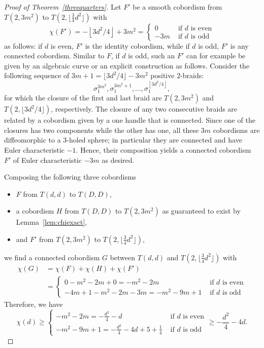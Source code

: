 \begin{proof}[Proof of Theorem~\ref{threequarters}]
Let $F'$ be a smooth cobordism from $T(2,3m^2)$ to $T(2,\lfloor \frac{3}{4}d^2\rfloor)$ with
\[
\chi(F')=-\left\lfloor 3d^2/4\right\rfloor+3m^2=
\begin{cases}
0&\text{ if $d$ is even}\\
-3m&\text{ if $d$ is odd}
\end{cases}
\]
as follows: if $d$ is even, $F'$ is the identity cobordism, while if $d$ is odd, $F'$ is any connected cobordism. Similar to $F$, if $d$ is odd, such an $F'$ can for example be given by an algebraic curve or an explicit construction as follows. Consider the following sequence of $3m+1=\lfloor 3d^2/4\rfloor-3m^2$ positive $2$-braids:
\[
\sigma_1^{3m^2},
\sigma_1^{3m^2+1},
\dots,
\sigma_1^{\left\lfloor 3d^2/4\right\rfloor},
\]
for which the closure of the first and last braid are $T(2,3m^2)$ and $T(2,\lfloor 3d^2/4\rfloor)$, respectively. The closure of any two consecutive braids are related by a cobordism given by a one handle that is connected. Since one of the closures has two components while the other has one, all these $3m$ cobordisms are diffeomorphic to a $3$-holed sphere; in particular they are connected and have Euler characteristic $-1$. Hence, their composition yields a connected cobordism $F'$ of Euler characteristic $-3m$ as desired.

Composing the following three cobordisms
\begin{itemize}
\item $F$ from $T(d,d)$ to $T(D,D)$,
\item a cobordism $H$ from $T(D,D)$ to $T(2,3m^2)$ as guaranteed to exist by Lem\-ma~\ref{lem:chiexact},
\item and $F'$ from $T(2,3m^2)$ to $T(2,\lfloor \frac{3}{4}d^2\rfloor)$,
\end{itemize}
we find a connected cobordism $G$ between $T(d,d)$ and $T(2,\lfloor\frac{3}{4}d^2\rfloor)$ with
\begin{align*}
\chi(G)&= \chi(F)+\chi(H)+\chi(F')
\\&=
\begin{cases}
0-m^2-2m+0=-m^2-2m&\text{ if $d$ is even}\\
-4m+1-m^2-2m-3m=-m^2-9m+1&\text{ if $d$ is odd}
\end{cases}
\end{align*}
Therefore, we have
\[
\chi(d)\geq
\begin{cases}
-m^2-2m=-\frac{d^2}{4}-d&\text{ if $d$ is even}\\-m^2-9m+1=-\frac{d^2}{4}-4d+5+\frac{1}{4}&\text{ if $d$ is odd}
\end{cases}
\geq-\frac{d^2}{4}-4d.
\]


\end{proof}
